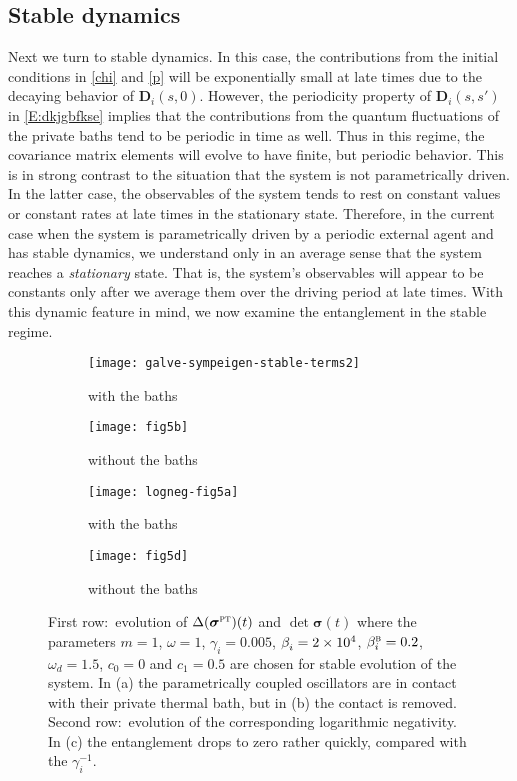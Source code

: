 \documentclass[11pt,a4paper]{article}
\begin{document}
\subsection{Stable dynamics}
Next we turn to stable dynamics. In this case, the contributions from the initial conditions in \eqref{chi} and \eqref{p} will be exponentially small at late times due to the decaying behavior of $\bm{D}_{i}(s,0)$. However, the periodicity property of $\bm{D}_{i}(s,s')$ in \eqref{E:dkjgbfkse} implies that the contributions from the quantum fluctuations of the private baths tend to be periodic in time as well. Thus in this regime, the covariance matrix elements will evolve to have finite, but periodic behavior. This is in strong contrast to the situation that the system is not parametrically driven. In the latter case, the observables of the system tends to rest on constant values {or constant rates} at late times in the stationary state. Therefore, in the current case when the system is parametrically driven by a periodic external agent and has stable dynamics, we understand only in an average sense that the system reaches a \textit{stationary} state. That is, the system's observables will appear to be constants only after we average them over the driving period at late times. With this dynamic feature in mind, we now examine the entanglement in the stable regime.

\begin{figure}
    \begin{subfigure}{0.49\textwidth}
     	\texttt{[image: galve-sympeigen-stable-terms2]}     
     	\caption{with the baths}
		\label{fig:galve-sympeigen-stable-terms-wbath} 
	\end{subfigure}
 	\hfill
	\begin{subfigure}{0.49\textwidth}
     	\texttt{[image: fig5b]}
     	\caption{without the baths}
		\label{fig:galve-sympeigen-stable-terms-wobath} 
	\end{subfigure}

    \begin{subfigure}{0.49\textwidth}
     	\texttt{[image: logneg-fig5a]}     
     	\caption{with the baths}
		\label{fig:logneg-fig5a} 
	\end{subfigure}
 	\hfill
	\begin{subfigure}{0.49\textwidth}
     	\texttt{[image: fig5d]}
     	\caption{without the baths}
		\label{fig:galve-det-wobath-stable} 
	\end{subfigure}
	\caption{First row:~evolution of $\Delta(\bm{\sigma}^{\textsc{pt}})(t)$ and $\det \bm{\sigma}(t)$ where the parameters $m=1$, $\omega=1$, $\gamma_{i} = 0.005$, $\beta_i^{\vphantom{\textsc{b}}}=2\times10^4$, $\beta_i^{\textsc{b}}=0.2$, $\omega_d = 1.5$, $c_0=0$ and $c_1=0.5$ are chosen for stable evolution of the system. In (a) the parametrically coupled oscillators are in contact with their private thermal bath, but in (b) the contact is removed. Second row:~evolution of the corresponding logarithmic negativity. In (c) the entanglement drops to zero rather quickly, compared with the $\gamma_i^{-1}$.}
	\label{fig:galve-sympeigen-stable-terms}
\end{figure}
\end{document}
